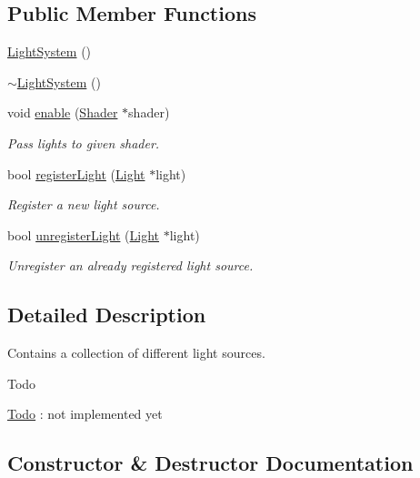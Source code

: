 \subsection*{Public Member Functions}
\begin{DoxyCompactItemize}
\item 
\mbox{\hyperlink{classec_1_1_light_system_ac4139d25af9956b05e4d74db83f10ede}{Light\+System}} ()
\item 
\mbox{\hyperlink{classec_1_1_light_system_a945503a2b607e87f13f87e5f95d157ef}{$\sim$\+Light\+System}} ()
\item 
void \mbox{\hyperlink{classec_1_1_light_system_a6569ed0dd8a15a461358add2ee514f92}{enable}} (\mbox{\hyperlink{classec_1_1_shader}{Shader}} $\ast$shader)
\begin{DoxyCompactList}\small\item\em Pass lights to given shader. \end{DoxyCompactList}\item 
bool \mbox{\hyperlink{classec_1_1_light_system_a5df705359d32cee10426c23a3ae95fad}{register\+Light}} (\mbox{\hyperlink{classec_1_1_light}{Light}} $\ast$light)
\begin{DoxyCompactList}\small\item\em Register a new light source. \end{DoxyCompactList}\item 
bool \mbox{\hyperlink{classec_1_1_light_system_ab1bd930134d6305a5666a165fc41d0f5}{unregister\+Light}} (\mbox{\hyperlink{classec_1_1_light}{Light}} $\ast$light)
\begin{DoxyCompactList}\small\item\em Unregister an already registered light source. \end{DoxyCompactList}\end{DoxyCompactItemize}


\subsection{Detailed Description}
Contains a collection of different light sources. 

\begin{DoxyRefDesc}{Todo}
\item[\mbox{\hyperlink{todo__todo000002}{Todo}}]\+: not implemented yet \end{DoxyRefDesc}


\subsection{Constructor \& Destructor Documentation}
\mbox{\label{classec_1_1_light_system_ac4139d25af9956b05e4d74db83f10ede}} 
